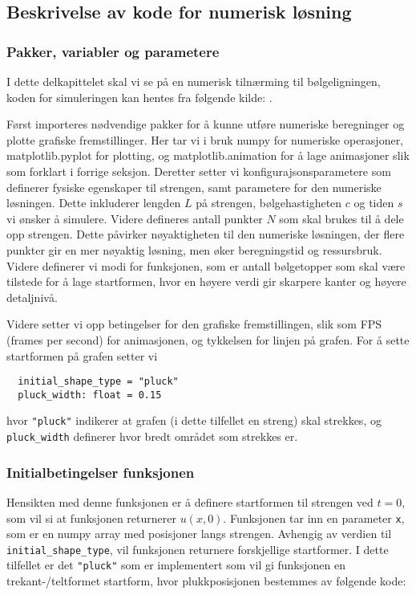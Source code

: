 \subsection{Beskrivelse av kode for numerisk løsning}
\subsubsection{Pakker, variabler og parametere}
I dette delkapittelet skal vi se på en numerisk tilnærming til bølgeligningen, koden for simuleringen kan hentes fra 
følgende kilde: \parencite{bølgeSimulering}. 

Først importeres nødvendige pakker for å kunne utføre numeriske beregninger og plotte grafiske fremstillinger. Her
tar vi i bruk numpy for numeriske operasjoner, matplotlib.pyplot for plotting, og matplotlib.animation for å lage 
animasjoner slik som forklart i forrige seksjon. Deretter setter vi konfigurajsonsparametere som definerer
fysiske egenskaper til strengen, samt parametere for den numeriske løsningen. Dette inkluderer lengden $L$ på strengen,
bølgehastigheten $c$ og tiden $s$ vi ønsker å simulere. Videre defineres antall punkter $N$ som skal brukes til å dele 
opp strengen. Dette påvirker nøyaktigheten til den numeriske løsningen, der flere punkter gir en mer nøyaktig løsning,
men øker beregningstid og ressursbruk. Videre definerer vi modi for funksjonen, som er antall bølgetopper som skal være 
tilstede for å lage startformen, hvor en høyere verdi gir skarpere kanter og høyere detaljnivå. 

Videre setter vi opp betingelser for den grafiske fremstillingen, slik som FPS (frames per second) for animasjonen, og
tykkelsen for linjen på grafen. For å sette startformen på grafen setter vi 

\begin{lstlisting}
  initial_shape_type = "pluck"
  pluck_width: float = 0.15
\end{lstlisting}

hvor \verb|"pluck"| indikerer at grafen (i dette tilfellet en streng) skal strekkes, og \verb|pluck_width| definerer hvor bredt området som strekkes er.

\subsubsection{Initialbetingelser funksjonen}
Hensikten med denne funksjonen er å definere startformen til strengen ved $t=0$, som vil si at funksjonen returnerer $u(x,0)$.
Funksjonen tar inn en parameter \verb|x|, som er en numpy array med posisjoner langs strengen. Avhengig av verdien til
\verb|initial_shape_type|, vil funksjonen returnere forskjellige startformer. I dette tilfellet er det \verb|"pluck"| 
som er implementert som vil gi funksjonen en trekant-/teltformet startform, hvor plukkposisjonen bestemmes av følgende 
kode:

